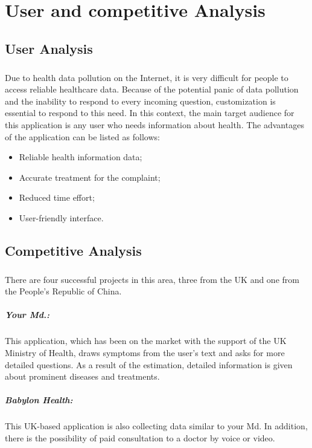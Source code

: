 \chapter{User and competitive Analysis} 

\section{User Analysis}

\paragraph{}
Due	to	health	data	pollution	on	the	Internet,	it	is	very	difficult	for	people	to	access	reliable	healthcare	data.	Because	of	the	potential	panic	of	data	pollution	and	the	inability	to	respond	to	every	incoming	question,	customization	is	essential	to	respond	to	this	need.	In	this	context,	the	main	target	audience	for	this	application	is	any	user	who	needs	information	about	health.	The	advantages	of	the	application	can	be	listed	as	follows:
\begin{itemize}
	\item Reliable	health	information	data;
	\item Accurate	treatment	for	the	complaint;
	\item Reduced	time	effort;
	\item User-friendly	interface.
\end{itemize}

\section{Competitive	Analysis	}

\paragraph{}
There	are	four	successful	projects	in	this	area,	three	from	the	UK	and	one	from	the	People's	Republic	of	China.		

\paragraph{Your	Md.:}This	application,	which	has	been	on	the	market	with	the	support	of	the	UK	Ministry	of	Health,	draws	symptoms	from	the	user's	text	and	asks	for	more	detailed	questions.	As	a	result	of	the	estimation,	detailed	information	is	given	about	prominent	diseases	and	treatments.	

\paragraph{Babylon	Health:}This	UK-based	application	is	also	collecting	data	similar	to	your	Md.	In	addition,	there	is	the	possibility	of	paid	consultation	to	a	doctor	by	voice	or	video.	

